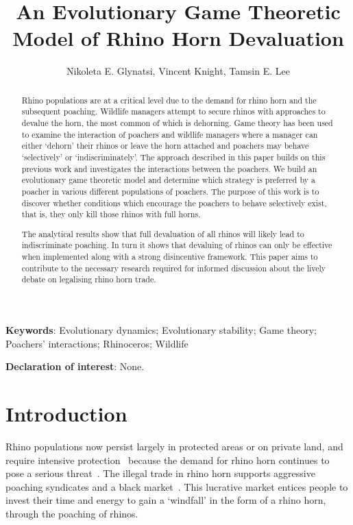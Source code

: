 \documentclass[10pt]{article}
\title{An Evolutionary Game Theoretic Model of Rhino Horn Devaluation}
\author{Nikoleta E. Glynatsi, Vincent Knight, Tamsin E. Lee}
\date{}
\begin{document}
\maketitle

\bigskip
\textbf{Keywords}: Evolutionary dynamics; Evolutionary stability; Game theory; \\
\indent Poachers' interactions; Rhinoceros; Wildlife

\bigskip

\textbf{Declaration of interest}: None.

\newpage
\begin{abstract}

Rhino populations are at a critical level due to the demand for rhino horn and
the subsequent poaching. Wildlife managers attempt to secure rhinos with
approaches to devalue the horn, the most common of which is dehorning. Game theory
has been used to examine the interaction of poachers and wildlife managers where
a manager can either `dehorn' their rhinos or leave the horn attached and poachers
may behave `selectively' or `indiscriminately'. The approach described in this paper
builds on this previous
work and investigates the interactions between the poachers. We build an evolutionary
game theoretic model and determine which strategy is preferred by a poacher in various
different populations of poachers. The purpose of this work is to discover whether
conditions which encourage the poachers to behave selectively exist, that is,
they only kill those rhinos with full horns.

The analytical
results show that full devaluation of all rhinos will likely lead to
indiscriminate poaching. In turn it shows that devaluing of rhinos can only be
effective when implemented along with a strong disincentive framework.
This paper aims to
contribute to the necessary research required for informed discussion about the
lively debate on legalising rhino horn trade.

\end{abstract}

\section{Introduction}\label{section:introduction}

Rhino populations now persist largely in protected areas or on private land, and
require intensive protection~\cite{Ferreira2014} because the demand for rhino
horn continues to pose a serious threat~\cite{Amin2006}. The illegal trade in rhino
horn supports aggressive poaching syndicates and a black market~\cite{Nowell1992, Warchol2003}.
This lucrative market entices people to invest their time and energy to gain a
`windfall' in the form of a rhino horn, through the poaching of rhinos.
\end{document}
